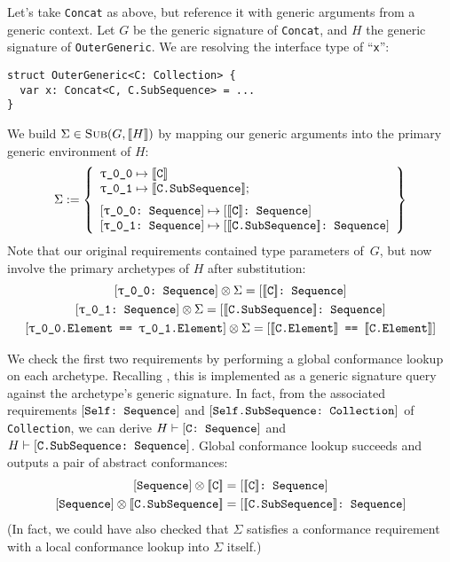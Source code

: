 \documentclass[../generics]{subfiles}
\begin{document}
\begin{example} Let's take \texttt{Concat} as above, but reference it with generic arguments from a generic context. Let $G$ be the generic signature of \texttt{Concat}, and $H$ the generic signature of \texttt{OuterGeneric}. We are resolving the interface type of ``\texttt{x}'':
\begin{Verbatim}
struct OuterGeneric<C: Collection> {
  var x: Concat<C, C.SubSequence> = ...
}
\end{Verbatim}
We build $\Sigma\in\textsc{Sub}({G, [\![H]\!]})$ by mapping our generic arguments into the primary generic environment of $H$:
\[
\Sigma := \SubstMapLongC{
\SubstType{\ttgp{0}{0}}{$\archetype{C}$}\\
\SubstType{\ttgp{0}{1}}{$\archetype{C.SubSequence}$}
}{
\SubstConf{\ttgp{0}{0}}{$\archetype{C}$}{Sequence}\\
\SubstConf{\ttgp{0}{1}}{$\archetype{C.SubSequence}$}{Sequence}
}
\]
Note that our original requirements contained type parameters of~$G$, but now involve the primary archetypes of $H$ after substitution:
\begin{gather*}
\ConfReq{\ttgp{0}{0}}{Sequence}\otimes\Sigma = \ConfReq{$\archetype{C}$}{Sequence}\\
\ConfReq{\ttgp{0}{1}}{Sequence}\otimes\Sigma = \ConfReq{$\archetype{C.SubSequence}$}{Sequence}\\
\SameReq{\ttgp{0}{0}.Element}{\ttgp{0}{1}.Element}\otimes\Sigma = \SameReq{$\archetype{C.Element}$}{$\archetype{C.Element}$}
\end{gather*}

We check the first two requirements by performing a global conformance lookup on each archetype. Recalling , this is implemented as a generic signature query against the archetype's generic signature. In fact, from the associated requirements $[\texttt{Self:~Sequence}]$ and $[\texttt{Self.SubSequence:~Collection}]$ of \texttt{Collection}, we can derive $H\vdash[\texttt{C:~Sequence}]$ and $H\vdash[\texttt{C.SubSequence:~Sequence}]$. Global conformance lookup succeeds and outputs a pair of abstract conformances:
\begin{gather*}
\protosym{Sequence}\otimes\archetype{C}=\ConfReq{$\archetype{C}$}{Sequence}\\
\protosym{Sequence}\otimes\archetype{C.SubSequence}=\ConfReq{$\archetype{C.SubSequence}$}{Sequence}
\end{gather*}
(In fact, we could have also checked that $\Sigma$ satisfies a conformance requirement with a local conformance lookup into $\Sigma$ itself.)


\end{example}
\end{document}
